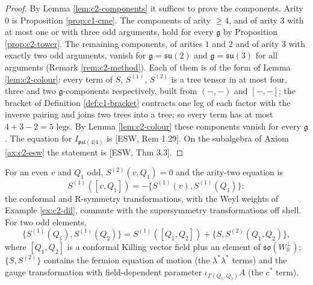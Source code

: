 \begin{proof}
By Lemma \ref{lem:c2-components} it suffices to prove the components. Arity $0$ is Proposition \ref{prop:c1-cme}. The components of arity $\ge4$, and of arity $3$ with at most one or with three odd arguments, hold for every $\mathfrak g$ by Proposition \ref{prop:c2-tower}. The remaining components, of arities $1$ and $2$ and of arity $3$ with exactly two odd arguments, vanish for $\mathfrak g=\mathfrak{su}(2)$ and $\mathfrak g=\mathfrak{su}(3)$ for all arguments (Remark \ref{rem:c2-method}). Each of them is of the form of Lemma \ref{lem:c2-colour}: every term of $S$, $S^{(1)}$, $S^{(2)}$ is a tree tensor in at most four, three and two $\mathfrak g$-components respectively, built from $(-,-)$ and $[-,-]$; the bracket of Definition \ref{def:c1-bracket} contracts one leg of each factor with the inverse pairing and joins two trees into a tree; so every term has at most $4+3-2=5$ legs. By Lemma \ref{lem:c2-colour} these components vanish for every $\mathfrak g$. The equation for $I_{\mathfrak{psl}(4|4)}$ is [ESW, Rem 1.29]. On the subalgebra of Axiom \ref{ax:c2-esw} the statement is [ESW, Thm 3.3].
\end{proof}

\begin{remark}
For an even $v$ and $Q_1$ odd, $S^{(2)}(v,Q_1)=0$ and the arity-two equation is
\[
S^{(1)}([v,Q_1])=-\{S^{(1)}(v),S^{(1)}(Q_1)\}:
\]
the conformal and R-symmetry transformations, with the Weyl weights of Example \ref{ex:c2-dil}, commute with the supersymmetry transformations off shell. For two odd elements,
\[
\{S^{(1)}(Q_1),S^{(1)}(Q_2)\}=S^{(1)}([Q_1,Q_2])+\{S,S^{(2)}(Q_1,Q_2)\},
\]
where $[Q_1,Q_2]$ is a conformal Killing vector field plus an element of $\mathfrak{so}(W_{\mathbb R}^\perp)$; $\{S,S^{(2)}\}$ contains the fermion equation of motion (the $\lambda^*\lambda^*$ terms) and the gauge transformation with field-dependent parameter $\iota_{\Gamma(Q_1,Q_2)}A$ (the $c^*$ term).
\end{remark}
